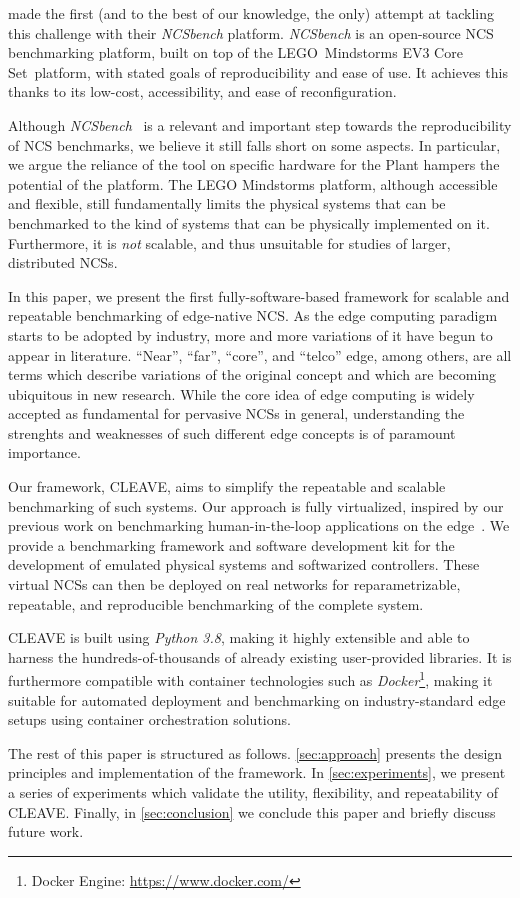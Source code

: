 \textcite{Zoppi2020NCSBench} made the first (and to the best of our knowledge, the only) attempt at tackling this challenge with their \emph{NCSbench} platform.
\emph{NCSbench} is an open-source \ac{NCS} benchmarking platform, built on top of the LEGO\textregistered{}\ Mindstorms EV3 Core Set\texttrademark{}\ platform, with stated goals of reproducibility and ease of use.
It achieves this thanks to its low-cost, accessibility, and ease of reconfiguration.

Although \emph{NCSbench}~\cite{Zoppi2020NCSBench} is a relevant and important step towards the reproducibility of \ac{NCS} benchmarks, we believe it still falls short on some aspects.
In particular, we argue the reliance of the tool on specific hardware for the Plant hampers the potential of the platform.
The LEGO Mindstorms platform, although accessible and flexible, still fundamentally limits the physical systems that can be benchmarked to the kind of systems that can be physically implemented on it.
Furthermore, it is \emph{not} scalable, and thus unsuitable for studies of larger, distributed \acp{NCS}.

In this paper, we present the first fully-software-based framework for scalable and repeatable benchmarking of edge-native \ac{NCS}.
As the edge computing paradigm starts to be adopted by industry, more and more variations of it have begun to appear in literature.
``Near'', ``far'', ``core'', and ``telco'' edge, among others, are all terms which describe variations of the original concept and which are becoming ubiquitous in new research.
While the core idea of edge computing is widely accepted as fundamental for pervasive \acp{NCS} in general, understanding the strenghts and weaknesses of such different edge concepts is of paramount importance.

Our framework, \ac{CLEAVE}, aims to simplify the repeatable and scalable benchmarking of such systems.
Our approach is fully virtualized, inspired by our previous work on benchmarking human-in-the-loop applications on the edge~\cite{Olguin2019EdgeDroid}.
We provide a benchmarking framework and software development kit for the development of emulated physical systems and softwarized controllers.
These virtual \acp{NCS} can then be deployed on real networks for reparametrizable, repeatable, and reproducible benchmarking of the complete system.

\ac{CLEAVE} is built using \emph{Python 3.8}, making it highly extensible and able to harness the hundreds-of-thousands of already existing user-provided libraries.
It is furthermore compatible with container technologies such as \emph{Docker}\footnote{Docker Engine: \url{https://www.docker.com/}}, making it suitable for automated deployment and benchmarking on industry-standard edge setups using container orchestration solutions.

The rest of this paper is structured as follows.
\cref{sec:approach} presents the design principles and implementation of the framework.
In \cref{sec:experiments}, we present a series of experiments which validate the utility, flexibility, and repeatability of \ac{CLEAVE}.
Finally, in \cref{sec:conclusion} we conclude this paper and briefly discuss future work.